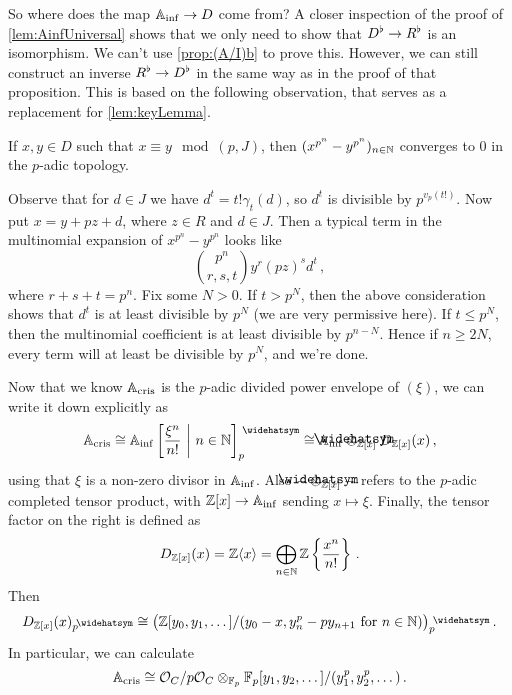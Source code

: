 So where does the map $\IA_\inf\morphism D$ come from? A closer inspection of the proof of \cref{lem:AinfUniversal} shows that we only need to show that $D^\flat\morphism R^\flat$ is an isomorphism. We can't use \cref{prop:(A/I)b} to prove this. However, we can still construct an inverse $R^\flat\morphism D^\flat$ in the same way as in the proof of that proposition. This is based on the following observation, that serves as a replacement for \cref{lem:keyLemma}.
\begin{lem*}
	If $x,y\in D$ such that $x\equiv y\mod (p,J)$, then $(x^{p^n}-y^{p^n})_{n\in\mathbb{N}}$ converges to $0$ in the $p$-adic topology.
\end{lem*}
\begin{proof*}
	Observe that for $d\in J$ we have $d^t=t!\gamma_t(d)$, so $d^t$ is divisible by $p^{v_p(t!)}$. Now put $x=y+pz+d$, where $z\in R$ and $d\in J$. Then a typical term in the multinomial expansion of $x^{p^n}-y^{p^n}$ looks like
	\begin{equation*}
		\binom{p^n}{r,s,t}y^r(pz)^sd^t\,,
	\end{equation*}
	where $r+s+t=p^n$. Fix some $N>0$. If $t>p^N$, then the above consideration shows that $d^t$ is at least divisible by $p^N$ (we are very permissive here). If $t\leq p^N$, then the multinomial coefficient is at least divisible by $p^{n-N}$. Hence if $n\geq 2N$, every term will at least be divisible by $p^N$, and we're done.
\end{proof*}
Now that we know $\mathbb{A}_{\mathrm{cris}}$ is the $p$-adic divided power envelope of $(\xi)$, we can write it down explicitly as
\begin{equation*}
	\IA_\cris\cong \IA_\inf\left[\frac{\xi^n}{n!}\st n\in\IN\right]_p^\complete\cong \IA_\inf\cotimes_{\IZ[x]}D_{\IZ[x]}(x)\,,
\end{equation*}
using that $\xi$ is a non-zero divisor in $\mathbb{A}_{\mathrm{inf}}$. Also $-\cotimes_{\IZ[x]}-$ refers to the $p$-adic completed tensor product, with $\IZ[x]\morphism\IA_\inf$ sending $x\mapsto \xi$. Finally, the tensor factor on the right is defined as
\begin{equation*}
	D_{\mathbb{Z}[x]}(x)=\mathbb{Z}\langle x\rangle =\bigoplus_{n\in\mathbb{N}}\mathbb{Z}\left\{\frac{x^n}{n!}\right\}\,.
\end{equation*}
Then
\begin{equation*}
	D_{\IZ[x]}(x)_p^\complete\cong\big(\IZ[y_0,y_1,\dotsc]/(y_0-x,y_n^p-py_{n+1} \text{ for }n\in\IN)\big)_p^\complete\,.
\end{equation*}
In particular, we can calculate
\begin{equation*}
	\mathbb{A}_{\mathrm{cris}}\cong \mathcal{O}_C/p\mathcal{O}_C\otimes_{\mathbb{F}_p}\mathbb{F}_p[y_1,y_2,\dotsc]/(y_1^p,y_2^p,\dotsc)\,.
\end{equation*}
